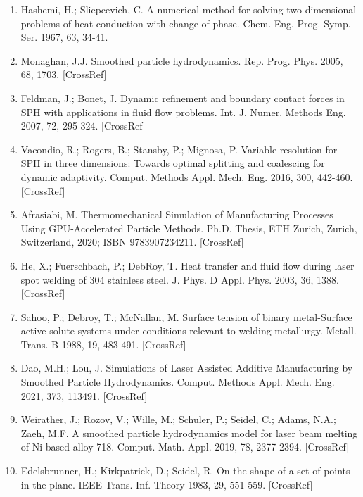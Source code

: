 \documentclass[10pt]{article}
\begin{document}
\begin{enumerate}
  \item Hashemi, H.; Sliepcevich, C. A numerical method for solving two-dimensional problems of heat conduction with change of phase. Chem. Eng. Prog. Symp. Ser. 1967, 63, 34-41.

  \item Monaghan, J.J. Smoothed particle hydrodynamics. Rep. Prog. Phys. 2005, 68, 1703. [CrossRef]

  \item Feldman, J.; Bonet, J. Dynamic refinement and boundary contact forces in SPH with applications in fluid flow problems. Int. J. Numer. Methods Eng. 2007, 72, 295-324. [CrossRef]

  \item Vacondio, R.; Rogers, B.; Stansby, P.; Mignosa, P. Variable resolution for SPH in three dimensions: Towards optimal splitting and coalescing for dynamic adaptivity. Comput. Methods Appl. Mech. Eng. 2016, 300, 442-460. [CrossRef]

  \item Afrasiabi, M. Thermomechanical Simulation of Manufacturing Processes Using GPU-Accelerated Particle Methods. Ph.D. Thesis, ETH Zurich, Zurich, Switzerland, 2020; ISBN 9783907234211. [CrossRef]

  \item He, X.; Fuerschbach, P.; DebRoy, T. Heat transfer and fluid flow during laser spot welding of 304 stainless steel. J. Phys. D Appl. Phys. 2003, 36, 1388. [CrossRef]

  \item Sahoo, P.; Debroy, T.; McNallan, M. Surface tension of binary metal-Surface active solute systems under conditions relevant to welding metallurgy. Metall. Trans. B 1988, 19, 483-491. [CrossRef]

  \item Dao, M.H.; Lou, J. Simulations of Laser Assisted Additive Manufacturing by Smoothed Particle Hydrodynamics. Comput. Methods Appl. Mech. Eng. 2021, 373, 113491. [CrossRef]

  \item Weirather, J.; Rozov, V.; Wille, M.; Schuler, P.; Seidel, C.; Adams, N.A.; Zaeh, M.F. A smoothed particle hydrodynamics model for laser beam melting of Ni-based alloy 718. Comput. Math. Appl. 2019, 78, 2377-2394. [CrossRef]

  \item Edelsbrunner, H.; Kirkpatrick, D.; Seidel, R. On the shape of a set of points in the plane. IEEE Trans. Inf. Theory 1983, 29, 551-559. [CrossRef]

\end{enumerate}
\end{document}

